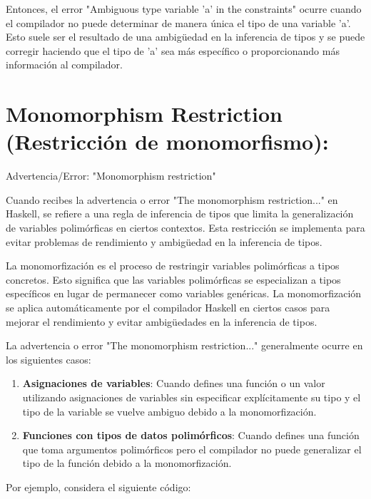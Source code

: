 \documentclass{article}
\begin{document}
Entonces, el error "Ambiguous type variable 'a' in the constraints" ocurre cuando el compilador no puede determinar de manera única el tipo de una variable 'a'. Esto suele ser el resultado de una ambigüedad en la inferencia de tipos y se puede corregir haciendo que el tipo de 'a' sea más específico o proporcionando más información al compilador.

\newpage
\section{Monomorphism Restriction (Restricción de monomorfismo):}

\begin{mdframed}[backgroundcolor=red!40,shadow=true,shadowsize=2pt,roundcorner=2pt]
    Advertencia/Error: "Monomorphism restriction"
\end{mdframed}

Cuando recibes la advertencia o error "The monomorphism restriction..." en Haskell, se refiere a una regla de inferencia de tipos que limita la generalización de variables polimórficas en ciertos contextos. Esta restricción se implementa para evitar problemas de rendimiento y ambigüedad en la inferencia de tipos.

La monomorfización es el proceso de restringir variables polimórficas a tipos concretos. Esto significa que las variables polimórficas se especializan a tipos específicos en lugar de permanecer como variables genéricas. La monomorfización se aplica automáticamente por el compilador Haskell en ciertos casos para mejorar el rendimiento y evitar ambigüedades en la inferencia de tipos.

La advertencia o error "The monomorphism restriction..." generalmente ocurre en los siguientes casos:

\begin{enumerate}
    \item \textbf{Asignaciones de variables}: Cuando defines una función o un valor utilizando asignaciones de variables sin especificar explícitamente su tipo y el tipo de la variable se vuelve ambiguo debido a la monomorfización.
    
    \item \textbf{Funciones con tipos de datos polimórficos}: Cuando defines una función que toma argumentos polimórficos pero el compilador no puede generalizar el tipo de la función debido a la monomorfización.
\end{enumerate}

Por ejemplo, considera el siguiente código:
\end{document}

